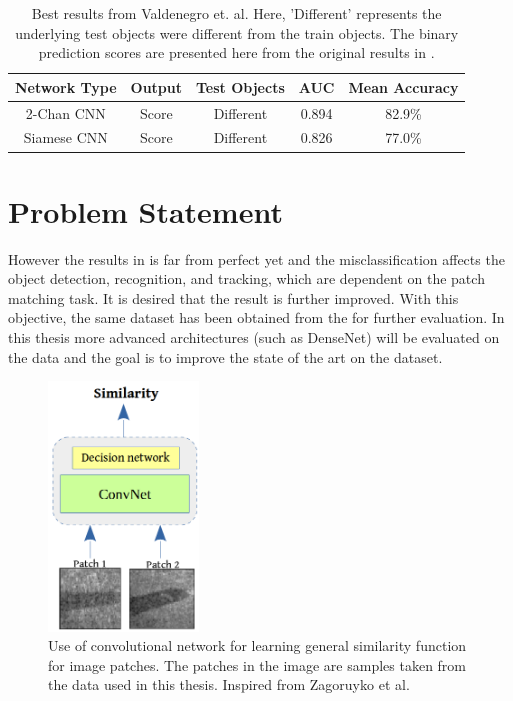 \begin{table}
\centering
 \begin{tabular}{|c c c c c|} 
 \hline\hline
 Network Type & Output & Test Objects & AUC & Mean Accuracy \\ [0.5ex] 
 \hline
 2-Chan CNN & Score & Different & 0.894 & 82.9\% \\ 
 \hline
 Siamese CNN & Score & Different & 0.826 & 77.0\% \\
 \hline \hline
\end{tabular}
\caption[Best result from Valdenegro et. al.]{Best results from Valdenegro et. al. Here, 'Different' represents the underlying test objects were different from the train objects. The binary prediction scores are presented here from the original 
results in \cite{stateoftheart}.}
\label{best_results_stateoftheart}
\end{table}

\newpage

\section{Problem Statement}
\label{sec:problem_statement}
However the results in \cite{stateoftheart} is far from perfect yet and the misclassification affects the object detection, recognition, and tracking, 
which are dependent on the patch matching task. It is desired that the result is further improved. With this objective, the same dataset has been obtained from the \cite{stateoftheart} for further evaluation.
In this thesis more advanced architectures (such as DenseNet) \cite{densenet} will be evaluated on the data and the goal is to improve the state of the art on the dataset. 


\begin{figure}
\hspace{1cm}
\includegraphics[width=4cm]{images/densenet/similarity_fn_grey}
\caption{Use of convolutional network for learning general similarity function for image patches. The patches in the image are samples taken from the data used in this thesis. 
Inspired from Zagoruyko et al.\cite{zagoruyko2015learning}}
\label{similarity_function_wraped}
\end{figure} 

